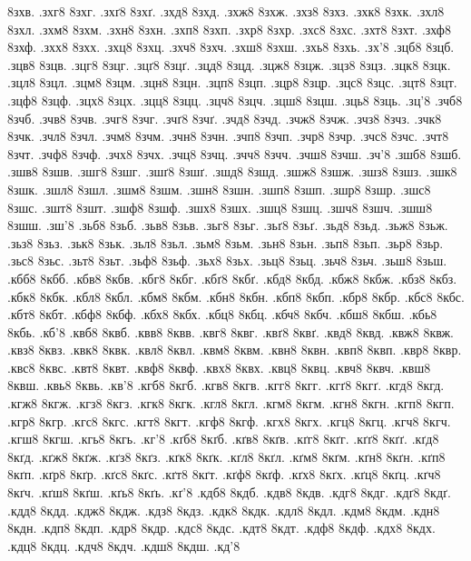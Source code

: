 {8зхв.
.зхг8
8зхг.
.зхґ8
8зхґ.
.зхд8
8зхд.
.зхж8
8зхж.
.зхз8
8зхз.
.зхк8
8зхк.
.зхл8
8зхл.
.зхм8
8зхм.
.зхн8
8зхн.
.зхп8
8зхп.
.зхр8
8зхр.
.зхс8
8зхс.
.зхт8
8зхт.
.зхф8
8зхф.
.зхх8
8зхх.
.зхц8
8зхц.
.зхч8
8зхч.
.зхш8
8зхш.
.зхь8
8зхь.
.зх'8
.зцб8
8зцб.
.зцв8
8зцв.
.зцг8
8зцг.
.зцґ8
8зцґ.
.зцд8
8зцд.
.зцж8
8зцж.
.зцз8
8зцз.
.зцк8
8зцк.
.зцл8
8зцл.
.зцм8
8зцм.
.зцн8
8зцн.
.зцп8
8зцп.
.зцр8
8зцр.
.зцс8
8зцс.
.зцт8
8зцт.
.зцф8
8зцф.
.зцх8
8зцх.
.зцц8
8зцц.
.зцч8
8зцч.
.зцш8
8зцш.
.зць8
8зць.
.зц'8
.зчб8
8зчб.
.зчв8
8зчв.
.зчг8
8зчг.
.зчґ8
8зчґ.
.зчд8
8зчд.
.зчж8
8зчж.
.зчз8
8зчз.
.зчк8
8зчк.
.зчл8
8зчл.
.зчм8
8зчм.
.зчн8
8зчн.
.зчп8
8зчп.
.зчр8
8зчр.
.зчс8
8зчс.
.зчт8
8зчт.
.зчф8
8зчф.
.зчх8
8зчх.
.зчц8
8зчц.
.зчч8
8зчч.
.зчш8
8зчш.
.зч'8
.зшб8
8зшб.
.зшв8
8зшв.
.зшг8
8зшг.
.зшґ8
8зшґ.
.зшд8
8зшд.
.зшж8
8зшж.
.зшз8
8зшз.
.зшк8
8зшк.
.зшл8
8зшл.
.зшм8
8зшм.
.зшн8
8зшн.
.зшп8
8зшп.
.зшр8
8зшр.
.зшс8
8зшс.
.зшт8
8зшт.
.зшф8
8зшф.
.зшх8
8зшх.
.зшц8
8зшц.
.зшч8
8зшч.
.зшш8
8зшш.
.зш'8
.зьб8
8зьб.
.зьв8
8зьв.
.зьг8
8зьг.
.зьґ8
8зьґ.
.зьд8
8зьд.
.зьж8
8зьж.
.зьз8
8зьз.
.зьк8
8зьк.
.зьл8
8зьл.
.зьм8
8зьм.
.зьн8
8зьн.
.зьп8
8зьп.
.зьр8
8зьр.
.зьс8
8зьс.
.зьт8
8зьт.
.зьф8
8зьф.
.зьх8
8зьх.
.зьц8
8зьц.
.зьч8
8зьч.
.зьш8
8зьш.
.кбб8
8кбб.
.кбв8
8кбв.
.кбг8
8кбг.
.кбґ8
8кбґ.
.кбд8
8кбд.
.кбж8
8кбж.
.кбз8
8кбз.
.кбк8
8кбк.
.кбл8
8кбл.
.кбм8
8кбм.
.кбн8
8кбн.
.кбп8
8кбп.
.кбр8
8кбр.
.кбс8
8кбс.
.кбт8
8кбт.
.кбф8
8кбф.
.кбх8
8кбх.
.кбц8
8кбц.
.кбч8
8кбч.
.кбш8
8кбш.
.кбь8
8кбь.
.кб'8
.квб8
8квб.
.квв8
8квв.
.квг8
8квг.
.квґ8
8квґ.
.квд8
8квд.
.квж8
8квж.
.квз8
8квз.
.квк8
8квк.
.квл8
8квл.
.квм8
8квм.
.квн8
8квн.
.квп8
8квп.
.квр8
8квр.
.квс8
8квс.
.квт8
8квт.
.квф8
8квф.
.квх8
8квх.
.квц8
8квц.
.квч8
8квч.
.квш8
8квш.
.квь8
8квь.
.кв'8
.кгб8
8кгб.
.кгв8
8кгв.
.кгг8
8кгг.
.кгґ8
8кгґ.
.кгд8
8кгд.
.кгж8
8кгж.
.кгз8
8кгз.
.кгк8
8кгк.
.кгл8
8кгл.
.кгм8
8кгм.
.кгн8
8кгн.
.кгп8
8кгп.
.кгр8
8кгр.
.кгс8
8кгс.
.кгт8
8кгт.
.кгф8
8кгф.
.кгх8
8кгх.
.кгц8
8кгц.
.кгч8
8кгч.
.кгш8
8кгш.
.кгь8
8кгь.
.кг'8
.кґб8
8кґб.
.кґв8
8кґв.
.кґг8
8кґг.
.кґґ8
8кґґ.
.кґд8
8кґд.
.кґж8
8кґж.
.кґз8
8кґз.
.кґк8
8кґк.
.кґл8
8кґл.
.кґм8
8кґм.
.кґн8
8кґн.
.кґп8
8кґп.
.кґр8
8кґр.
.кґс8
8кґс.
.кґт8
8кґт.
.кґф8
8кґф.
.кґх8
8кґх.
.кґц8
8кґц.
.кґч8
8кґч.
.кґш8
8кґш.
.кґь8
8кґь.
.кґ'8
.кдб8
8кдб.
.кдв8
8кдв.
.кдг8
8кдг.
.кдґ8
8кдґ.
.кдд8
8кдд.
.кдж8
8кдж.
.кдз8
8кдз.
.кдк8
8кдк.
.кдл8
8кдл.
.кдм8
8кдм.
.кдн8
8кдн.
.кдп8
8кдп.
.кдр8
8кдр.
.кдс8
8кдс.
.кдт8
8кдт.
.кдф8
8кдф.
.кдх8
8кдх.
.кдц8
8кдц.
.кдч8
8кдч.
.кдш8
8кдш.
.кд'8
}

